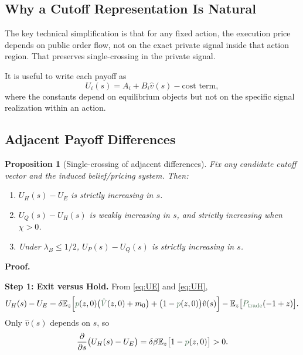 \documentclass[11pt,a4paper]{article}
\theoremstyle{definition}
\theoremstyle{plain}
\newtheorem{proposition}{Proposition}[section]
\theoremstyle{remark}
\newcommand{\E}{\mathbb{E}}
\newcommand{\1}{\mathbf{1}}
\newcommand{\outcome}[1]{{\color{ForestGreen!50!black}#1}}
\begin{document}
\subsection{Why a Cutoff Representation Is Natural}

The key technical simplification is that for any fixed action, the execution price depends on public order flow, not on the exact private signal inside that action region. That preserves single-crossing in the private signal.

It is useful to write each payoff as
\begin{equation}
U_i(s)=A_i + B_i \hat v(s) - \text{cost term},
\label{eq:affine-form}
\end{equation}
where the constants depend on equilibrium objects but not on the specific signal realization within an action.

\subsection{Adjacent Payoff Differences}

\begin{proposition}[Single-crossing of adjacent differences]
\label{prop:single-crossing}
Fix any candidate cutoff vector and the induced belief/pricing system. Then:
\begin{enumerate}
\item $U_H(s)-U_E$ is strictly increasing in $s$.
\item $U_Q(s)-U_H(s)$ is weakly increasing in $s$, and strictly increasing when $\chi>0$.
\item Under $\lambda_B\le 1/2$, $U_P(s)-U_Q(s)$ is strictly increasing in $s$.
\end{enumerate}
\end{proposition}

\textbf{Proof.}

\textbf{Step 1: Exit versus Hold.}
From \eqref{eq:UE} and \eqref{eq:UH},
\begin{equation}
U_H(s)-U_E
=
\delta \E_z\!\left[
\outcome{p}(z,0)\big(\outcome{\hat V}(z,0)+m_0\big)
+
\big(1-\outcome{p}(z,0)\big)\hat v(s)
\right]
- \E_z\big[\outcome{P_{\textup{trade}}}(-1+z)\big].
\label{eq:diff-EH}
\end{equation}
Only $\hat v(s)$ depends on $s$, so
\begin{equation}
\frac{\partial}{\partial s}\big(U_H(s)-U_E\big)
=
\delta \beta \E_z\big[1-\outcome{p}(z,0)\big] > 0.
\label{eq:diff-EH-deriv}
\end{equation}
\end{document}
